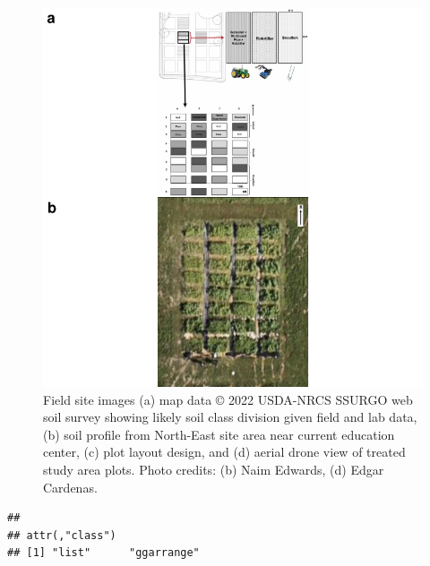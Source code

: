 \documentclass[
]{article}
\begin{document}
\begin{figure}
\centering
\includegraphics{meth_files/figure-latex/plots-2.pdf}
\caption{\label{fig:plots-2}Field site images (a) map data © 2022 USDA-NRCS SSURGO web soil survey showing likely soil class division given field and lab data, (b) soil profile from North-East site area near current education center, (c) plot layout design, and (d) aerial drone view of treated study area plots. Photo credits: (b) Naim Edwards, (d) Edgar Cardenas.}
\end{figure}

\begin{verbatim}
## 
## attr(,"class")
## [1] "list"      "ggarrange"
\end{verbatim}
\end{document}
